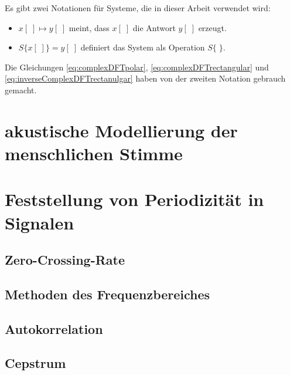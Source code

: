 Es gibt zwei Notationen für Systeme, die in dieser Arbeit verwendet wird:
\begin{itemize}
\item $x[\;]\mapsto y[\;]$ meint, dass $x[\;]$ die Antwort $y[\;]$ erzeugt.
\item $S\{ x[\;] \} = y[\;]$ definiert das System als Operation $S\{\;\}$. \cite[]{dspMichiganSystems}
\end{itemize}

Die Gleichungen \ref{eq:complexDFTpolar}, \ref{eq:complexDFTrectangular} und \ref{eq:inverseComplexDFTrectanulgar}  haben von der zweiten Notation gebrauch gemacht. 



\section{akustische Modellierung der menschlichen Stimme}
\section{Feststellung von Periodizität in Signalen}
\subsection{Zero-Crossing-Rate}
\subsection{Methoden des Frequenzbereiches}
\subsection{Autokorrelation}
\subsection{Cepstrum}